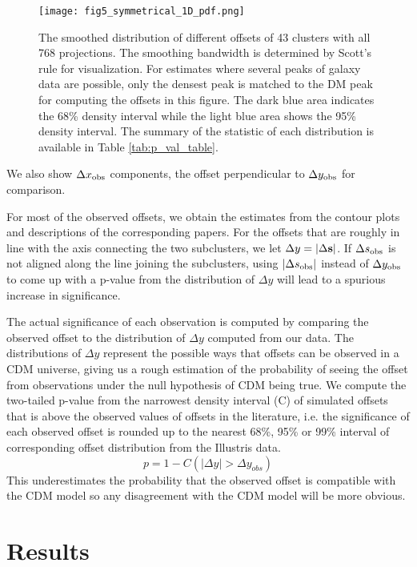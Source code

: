 \begin{figure*}
	\centering
	\texttt{[image: fig5\_symmetrical\_1D\_pdf.png]}
	\caption{The smoothed distribution of different offsets of 43 clusters with all 768
	projections. The smoothing bandwidth is determined by Scott's rule for 
	visualization.
	For estimates where several peaks of galaxy data are 
	possible, only the densest peak is matched to the DM peak for computing
	the offsets in this figure. 
	The dark blue area indicates the 68\% density interval
	while the light blue area shows the 95\% density interval. 
	The summary of the statistic of each distribution is available in
	Table \ref{tab:p_val_table}. 
		\label{fig:offset_distributions}}
\end{figure*}
We also show $\Delta x_{\rm obs}$ components, the offset perpendicular to
$\Delta y_{\rm obs}$ for comparison.

For most of the observed offsets, we obtain the estimates from the contour plots 
and descriptions of the corresponding papers. 
For the offsets that are roughly in line with the axis connecting the two subclusters,
we let $\Delta y = |\Delta {\bf s}|$. 
If $\Delta s_{\rm obs}$ is not aligned along the line joining the subclusters,
using $|\Delta s_{\rm obs}|$ instead of $\Delta y_{\rm obs}$ to come 
up with a p-value from the distribution of 
$\Delta y$ will lead to a spurious increase in significance.

The actual significance of each observation is computed by comparing the
observed offset to the distribution of $\Delta y$ computed from our data. 
The distributions of $\Delta y$ represent the possible ways that offsets can be observed in a CDM
universe, giving us a rough estimation of the probability 
of seeing the offset from observations under the null hypothesis of CDM 
being true. 
We compute the two-tailed 
p-value from the narrowest density interval (C) of simulated offsets 
that is above the observed values of offsets in the literature, 
i.e. the significance of each observed offset is rounded up to the nearest 68\%, 95\% or 99\%
interval of corresponding offset distribution from the Illustris data. 
\begin{equation}
	p = 1 - C(|\Delta y| > \Delta y_{obs})
\end{equation}
This underestimates the probability that the
observed offset is compatible with the CDM model so
any disagreement with the CDM model will be more obvious. 

 
\section{Results} 
\label{sec:results}

